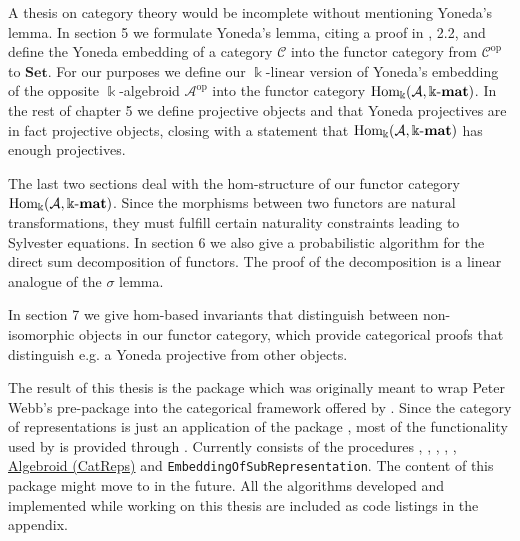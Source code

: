 A thesis on category theory would be incomplete without mentioning Yoneda's lemma. In section 5 we
formulate Yoneda's lemma, citing a proof in \cite{[context]}, 2.2, and define the Yoneda embedding of a category $\mathcal{C}$ into the
functor category from $\mathcal{C}^{\text{op}}$ to $\mathbf{Set}$. For our purposes we
define our $\Bbbk$-linear version of Yoneda's embedding of the opposite $\Bbbk$-algebroid $\mathcal{A}^{\text{op}}$
into the functor category $\mathrm{Hom_{\Bbbk}}(\mathcal{A},\Bbbk\textnormal{-}\mathbf{mat})$. In the rest of chapter 5 we define projective objects and that
Yoneda projectives are in fact projective objects, closing with a statement that $\mathrm{Hom_{\Bbbk}}(\mathcal{A},\Bbbk\textnormal{-}\mathbf{mat})$ has enough projectives.

The last two sections deal with the hom-structure of our functor category $\mathrm{Hom_{\Bbbk}}(\mathcal{A},\Bbbk\textnormal{-}\mathbf{mat})$. Since the morphisms between two
functors are natural transformations, they must fulfill certain naturality constraints leading to Sylvester equations. 
In section 6 we also give a probabilistic algorithm for the direct sum decomposition of functors. The proof of the decomposition is a linear
analogue of the $\sigma$ lemma.

In section 7 we give hom-based invariants that distinguish between non-isomorphic objects in our functor category, which provide 
categorical proofs that distinguish e.g. a Yoneda projective from other objects.

The result of this thesis is the \Gap{} package \CatReps{} which was originally meant to wrap Peter Webb's
pre-package \catreps{} into the categorical framework offered by \CAP. Since the category of representations is just an application of the package
\FunctorCategories, most of the functionality used by \CatReps is provided through \FunctorCategories.
Currently \CatReps consists of the procedures , ,
, , ,
\hyperref[func:Algebroid_CatReps]{Algebroid (CatReps)} and \texttt{EmbeddingOfSubRepresentation}. The content of this package might move
to \FunctorCategories in the future. All the algorithms developed and implemented while working on this
thesis are included as code listings in the appendix.
